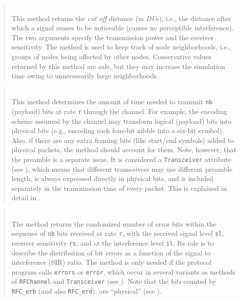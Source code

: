 \begin{quote}
\noindent{} \hspace{0in}\vspace{0.05in}\\
\noindent
This method returns the {\em cut off\/} distance (in {\em DU\/}s), i.e., the
distance after which a signal ceases to be noticeable (causes no perceptible
interference).
The two arguments specify the transmission power and the receiver sensitivity.
The method is used to keep track of node neighborhoods, i.e., groups of nodes
being affected by other nodes.
Conservative values returned by this method are safe, but they may increase
the simulation time owing to unnecessarily large neighborhoods.
\end{quote}

\begin{quote}
\noindent{} \hspace{0in}\vspace{0.05in}\\
\noindent
This method determines the amount of time needed to transmit {\tt nb} (payload)
bits at rate {\tt r} through the channel.
For example, the encoding scheme assumed by the channel may transform
logical (payload) bits into physical bits (e.g., encoding each four-bit nibble
into a six-bit symbol).
Also, if there are any extra framing bits (like start/end symbols) added to
physical packets, the method should account for them.
Note, however, that the preamble is a separate issue.
It is considered a {\tt Transceiver} attribute (see ),
which means that different transceivers may use
different preamble length, is always expressed directly in physical bits,
and is included separately in the transmission time of every packet.
This is explained in detail in .
\end{quote}

\begin{quote}
\noindent{} \hspace{0in}\vspace{0.05in}\\
\noindent
The method returns the randomized number of error bits within the sequence of
{\tt nb} bits received at rate {\tt r}, with the received signal level
{\tt sl}, receiver sensitivity {\tt rs}, and at the interference
level {\tt il}.
Its role is to describe the distribution of bit errors as a function of the
signal to interference (SIR) ratio.
The method is only needed if the protocol program calls
{\tt errors} or {\tt error}, which occur in several variants as methods of
{\tt RFChannel} and {\tt Transceiver} (see ).
Note that the {\em bits\/} counted by {\tt RFC\_erb} (and also {\tt RFC\_erd}),
are ``physical'' (see ).
\end{quote}

